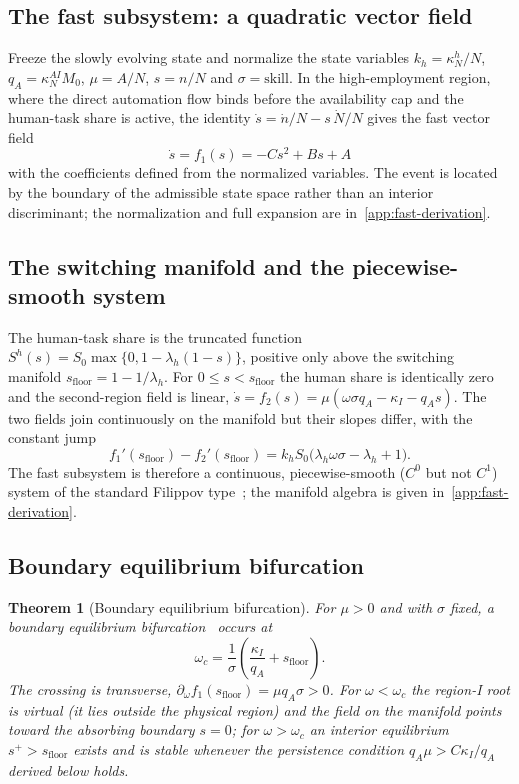 \documentclass[review,12pt]{elsarticle}
\theoremstyle{plain}
\newtheorem{theorem}{Theorem}
\theoremstyle{definition}
\theoremstyle{remark}
\begin{document}
\subsection{The fast subsystem: a quadratic vector field}
Freeze the slowly evolving state and normalize the state variables
$k_h=\kappa_N^h/N$, $q_A=\kappa_N^{AI}M_0$, $\mu=A/N$, $s=n/N$ and
$\sigma=\text{skill}$. In the high-employment region, where the direct
automation flow binds before the availability cap and the human-task share is
active, the identity $\dot s=\dot n/N-s\,\dot N/N$ gives the fast vector
field
\begin{equation*}
\boxed{\ \dot s=f_1(s)=-Cs^2+Bs+A\ }
\end{equation*}
with the coefficients defined from the normalized variables. The event is located by the boundary of the admissible state space rather than an interior discriminant; the normalization and full expansion are in~\ref{app:fast-derivation}.

\subsection{The switching manifold and the piecewise-smooth system}
The human-task share is the truncated function
$S^h(s)=S_0\max\{0,1-\lambda_h(1-s)\}$, positive only above the switching
manifold $s_{\text{floor}}=1-1/\lambda_h$. For $0\le s<s_{\text{floor}}$ the
human share is identically zero and the second-region field is linear,
$\dot s=f_2(s)=\mu(\omega\sigma q_A-\kappa_I-q_A s)$. The two fields join
continuously on the manifold but their slopes differ, with the constant jump
\begin{equation*}
f_1'(s_{\text{floor}})-f_2'(s_{\text{floor}})
=k_hS_0\bigl(\lambda_h\omega\sigma-\lambda_h+1\bigr).
\end{equation*}
The fast subsystem is therefore a continuous, piecewise-smooth ($C^0$ but not
$C^1$) system of the standard Filippov type~\citep{diBernardo2008}; the
manifold algebra is given in~\ref{app:fast-derivation}.

\subsection{Boundary equilibrium bifurcation}
\begin{theorem}[Boundary equilibrium bifurcation]
\label{thm:beb}
For $\mu>0$ and with $\sigma$ fixed, a boundary equilibrium bifurcation~\citep{Sotomayor1973,GH1983,Kuznetsov2023} occurs at
\begin{equation*}
\boxed{\ \omega_c=\frac1\sigma\left(\frac{\kappa_I}{q_A}+s_{\text{floor}}\right).\ }
\end{equation*}
The crossing is transverse, $\partial_\omega f_1(s_{\text{floor}})=\mu q_A\sigma>0$. For $\omega<\omega_c$ the region-I root is virtual (it lies outside the physical region) and the field on the manifold points toward the absorbing boundary $s=0$; for $\omega>\omega_c$ an interior equilibrium $s^+>s_{\text{floor}}$ exists and is stable whenever the persistence condition $q_A\mu>C\kappa_I/q_A$ derived below holds.
\end{theorem}
\end{document}
